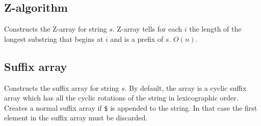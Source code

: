 \documentclass{article}
\begin{document}
\subsection {Z-algorithm}

Constructs the Z-array for string $s$. Z-array tells for each $i$ the length of the longest substring that begins at $i$ and is a prefix of $s$. $O(n)$.



\subsection {Suffix array}

Constructs the suffix array for string $s$. By default, the array is a cyclic suffix array which has all the cyclic rotations of the string in lexicographic order. Creates a normal suffix array if \texttt{\$} is appended to the string. In that case the first element in the suffix array must be discarded.


\end{document}
